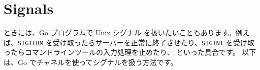 \section{Signals}

ときには、Go プログラムで Unix シグナル を扱いたいこともあります。例えば、\texttt{SIGTERM} を受け取ったらサーバーを正常に終了させたり、\texttt{SIGINT} を受け取ったらコマンドラインツールの入力処理を止めたり、 といった具合です。 以下は、Go でチャネルを使ってシグナルを扱う方法です。




